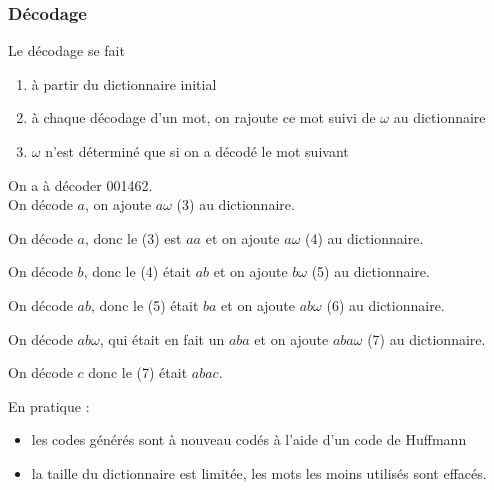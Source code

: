 \documentclass[main.tex]{subfiles}
\begin{document}
\subsubsection{Décodage}
Le décodage se fait
\begin{enumerate}
\item à partir du dictionnaire initial
\item à chaque décodage d'un mot, on rajoute ce mot suivi de $\omega$ au dictionnaire
\item $\omega$ n'est déterminé que si on a décodé le mot suivant
\end{enumerate}

\begin{exemple}
On a à décoder 001462.\\

On décode $a$, on ajoute $a\omega$ (3) au dictionnaire.

On décode $a$, donc le (3) est $aa$ et on ajoute $a\omega$ (4) au dictionnaire.

On décode $b$, donc le (4) était $ab$ et on ajoute $b\omega$ (5) au dictionnaire.

On décode $ab$, donc le (5) était $ba$ et on ajoute $ab\omega$ (6) au dictionnaire.

On décode $ab\omega$, qui était en fait un $aba$ et on ajoute $aba\omega$ (7) au dictionnaire.

On décode $c$ donc le (7) était $abac$.
\end{exemple}

En pratique :
\begin{itemize}
\item les codes générés sont à nouveau codés à l'aide d'un code de Huffmann
\item la taille du dictionnaire est limitée, les mots les moins utilisés sont effacés.
\end{itemize}
\end{document}
